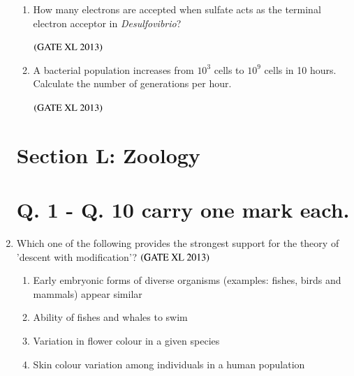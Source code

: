\documentclass[journal]{IEEEtran}
\begin{document}
\begin{enumerate}
\begin{enumerate}[label=\arabic*., start=11]
\item How many electrons are accepted when sulfate acts as the terminal electron acceptor in \textit{Desulfovibrio}?
\begin{enumerate}
\end{enumerate}
\hfill $\left(\text{GATE XL 2013}\right)$

\item A bacterial population increases from $10^3$ cells to $10^9$ cells in 10 hours. Calculate the number of generations per hour.
\begin{enumerate}
\end{enumerate}
\hfill $\left(\text{GATE XL 2013}\right)$
\end{enumerate}
\clearpage
\section*{Section L: Zoology}
\setcounter{enumi}{0}
\section*{Q. 1 - Q. 10 carry one mark each.}

\item Which one of the following provides the strongest support for the theory of 'descent with modification'? \hfill $\left(\text{GATE XL 2013}\right)$
\begin{enumerate}
    \item Early embryonic forms of diverse organisms (examples: fishes, birds and mammals) appear similar
    \item Ability of fishes and whales to swim
    \item Variation in flower colour in a given species
    \item Skin colour variation among individuals in a human population
\end{enumerate}


\end{enumerate}
\end{document}
